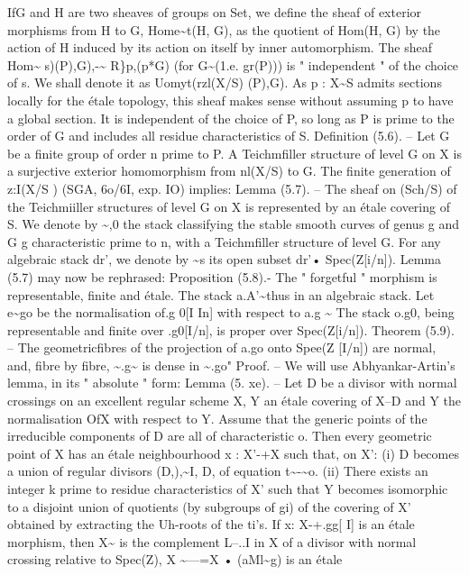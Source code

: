 \documentclass[11pt]{article}
\theoremstyle{plain}
\theoremstyle{definition}
\theoremstyle{remark}
\begin{document}
IfG and H are two sheaves of groups on Set, we define the sheaf of exterior morphisms from H to G, Home\textasciitilde{}t(H, G), as the quotient of Hom(H, G) by the action of H induced by its action on itself by inner automorphism. The sheaf Hom\textasciitilde{} s)(P),G),-\textasciitilde{} R\}p,(p*G) (for G\textasciitilde{}(1.e. gr(P))) is " independent " of the choice of s. We shall denote it as Uomyt(rzl(X/S) (P),G). As p : X\textasciitilde{}S admits sections locally for the étale topology, this sheaf makes sense without assuming p to have a global section. It is independent of the choice of P, so long as P is prime to the order of G and includes all residue characteristics of S. Definition (5.6). -- Let G be a finite group of order n prime to P. A Teichmfiller structure of level G on X is a surjective exterior homomorphism from nl(X/S) to G. The finite generation of z:I(X/S ) (SGA, 6o/6I, exp. IO) implies: Lemma (5.7). -- The sheaf on (Sch/S) of the Teichmiiller structures of level G on X is represented by an étale covering of S. We denote by \textasciitilde{},0 the stack classifying the stable smooth curves of genus g and G g characteristic prime to n, with a Teichmfiller structure of level G. For any algebraic stack dr', we denote by \textasciitilde{}s its open subset dr'• Spec(Z[i/n]). Lemma (5.7) may now be rephrased: Proposition (5.8).- The " forgetful " morphism is representable, finite and étale. The stack a.A'\textasciitilde{}thus in an algebraic stack. Let e\textasciitilde{}go be the normalisation of.g 0[I In] with respect to a.g \textasciitilde{} The stack o.g0, being representable and finite over .g0[I/n], is proper over Spec(Z[i/n]). Theorem (5.9). -- The geometricfibres of the projection of a.go onto Spee(Z [I/n]) are normal, and, fibre by fibre, \textasciitilde{}.g\textasciitilde{} is dense in \textasciitilde{}.go" Proof. -- We will use Abhyankar-Artin's lemma, in its " absolute " form: Lemma (5. xe). -- Let D be a divisor with normal crossings on an excellent regular scheme X, Y an étale covering of X--D and Y the normalisation OfX with respect to Y. Assume that the generic points of the irreducible components of D are all of characteristic o. Then every geometric point of X has an étale neighbourhood x : X'-+X such that, on X': (i) D becomes a union of regular divisors (D,),\textasciitilde{}I, D, of equation t\textasciitilde{}-\textasciitilde{}o. (ii) There exists an integer k prime to residue characteristics of X' such that Y becomes isomorphic to a disjoint union of quotients (by subgroups of gi) of the covering of X' obtained by extracting the Uh-roots of the ti's. If x: X-+.gg[ I] is an étale morphism, then X\textasciitilde{} is the complement L--..I in X of a divisor with normal crossing relative to Spec(Z), X \textasciitilde{}---=X • (aMl\textasciitilde{}g) is an étale
\end{document}
